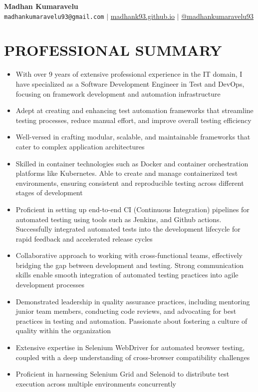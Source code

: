 \documentclass[letterpaper,11pt]{article}
\newcommand{\resumeItem}[1]{
  \item\small{
    {#1 \vspace{-1pt}}
  }
}
\begin{document}
\begin{center}
    \textbf{\Huge Madhan Kumaravelu} \\ \vspace{5pt}
    \hspace{1pt} \faEnvelope \hspace{2pt} \texttt{madhankumaravelu93@gmail.com} \hspace{1pt} $|$ 
    \hspace{1pt} \faGlobe \hspace{2pt} \href{http://madhank93.github.io/}{madhank93.github.io} \hspace{1pt} $|$
    \hspace{1pt} \faMedium \hspace{2pt} \href{https://medium.com/@madhankumaravelu93}{@madhankumaravelu93}
    \\ \vspace{-3pt}
\end{center}

\section{PROFESSIONAL SUMMARY}
\begin{itemize}[noitemsep,topsep=0pt]
    \resumeItem{With over 9 years of extensive professional experience in the IT domain, I have specialized as a Software Development Engineer in Test and DevOps, focusing on framework development and automation infrastructure}
    \resumeItem{Adept at creating and enhancing test automation frameworks that streamline testing processes, reduce manual effort, and improve overall testing efficiency}
    \resumeItem{Well-versed in crafting modular, scalable, and maintainable frameworks that cater to complex application architectures}
    \resumeItem{Skilled in container technologies such as Docker and container orchestration platforms like Kubernetes. Able to create and manage containerized test environments, ensuring consistent and reproducible testing across different stages of development}
    \resumeItem{Proficient in setting up end-to-end CI (Continuous Integration) pipelines for automated testing using tools such as Jenkins, and Github actions. Successfully integrated automated tests into the development lifecycle for rapid feedback and accelerated release cycles}
    \resumeItem{Collaborative approach to working with cross-functional teams, effectively bridging the gap between development and testing. Strong communication skills enable smooth integration of automated testing practices into agile development processes}
    \resumeItem{Demonstrated leadership in quality assurance practices, including mentoring junior team members, conducting code reviews, and advocating for best practices in testing and automation. Passionate about fostering a culture of quality within the organization}
    \resumeItem{Extensive expertise in Selenium WebDriver for automated browser testing, coupled with a deep understanding of cross-browser compatibility challenges}
    \resumeItem{Proficient in harnessing Selenium Grid and Selenoid to distribute test execution across multiple environments concurrently}
\end{itemize}
\end{document}
